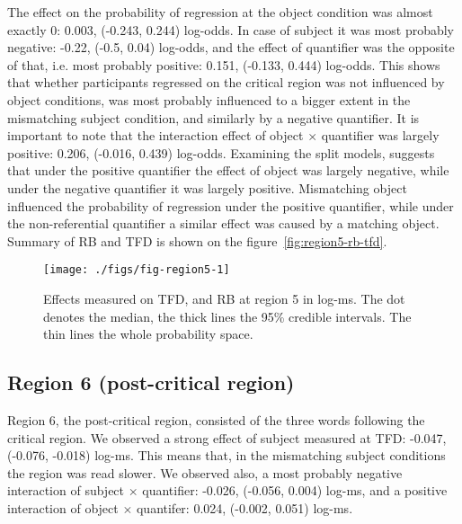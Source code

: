 The effect on the probability of regression at the object condition was
almost exactly 0: 0.003, (-0.243, 0.244) log-odds. In case of subject it was most probably negative: -0.22, (-0.5, 0.04) log-odds, and the effect of quantifier was the opposite of that, i.e. most probably positive: 0.151, (-0.133, 0.444) log-odds. This shows that whether participants regressed on the critical region was not influenced by object conditions, was most probably influenced to a bigger extent in the mismatching subject condition, and similarly by a negative quantifier.
It is important to note that the interaction effect of object $\times$ quantifier was largely positive: 0.206, (-0.016, 0.439) log-odds. Examining the split models, suggests that under the positive quantifier the effect of object was largely negative, while under the negative quantifier it was largely positive. Mismatching object influenced the probability of regression under the positive quantifier, while under the non-referential quantifier a similar effect was caused by a matching object.
Summary of RB and TFD is shown on the figure~\ref{fig:region5-rb-tfd}.

\begin{knitrout}
\color{fgcolor}\begin{figure}
\texttt{[image: ./figs/fig-region5-1]} \caption{\label{fig:region5-rb-tfd}Effects measured on TFD, and RB at region 5 in log-ms. The dot denotes the median, the thick lines the 95\% credible intervals. The thin lines the whole probability space.}\label{fig:fig-region5}
\end{figure}


\end{knitrout}



\subsection{Region 6 (post-critical region)}

Region 6, the post-critical region, consisted of the three words following the critical region.
We observed a strong effect of subject measured at TFD: -0.047, (-0.076, -0.018) log-ms. This means that, in the mismatching subject conditions the region was read slower. We observed also, a most probably negative interaction of subject $\times$ quantifier: -0.026, (-0.056, 0.004) log-ms, and a positive interaction of object $\times$ quantifer: 0.024, (-0.002, 0.051) log-ms.


